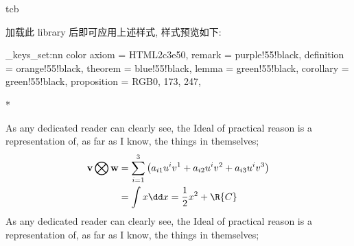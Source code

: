 \begin{function}[added=2025-06-29]{tcb}
  \begin{syntax}
  \end{syntax}
  加载此 library 后即可应用上述样式, 样式预览如下: 
\end{function}
\begingroup
\ExplSyntaxOn\makeatletter
\ztex_keys_set:nn {color}
  {
    axiom       = {HTML}{2c3e50},
    remark      = purple!55!black,
    definition  = orange!55!black,
    theorem     = blue!55!black,
    lemma       = green!55!black,
    corollary   = green!55!black,
    proposition = {RGB}{0, 173, 247},
  }
\makeatother\ExplSyntaxOff
{}
\begin{DocExample}*
\begin{theorem}
As any dedicated reader can clearly see, the Ideal of practical
reason is a representation of, as far as I know, the things in themselves; 
\begin{align}
\underset{}{\mathbf{v} \bigotimes \mathbf{w}} 
    & = \sum_{i=1}^3\left(a_{i1}u^iv^1+a_{i2}u^iv^2+a_{i3}u^iv^3\right) \\
    & = \int x \dd x = \frac12 x^2 + \R{C} 
  \end{align}  
As any dedicated reader can clearly see, the Ideal of practical
reason is a representation of, as far as I know, the things in themselves;%
\end{theorem}
\end{DocExample}
\endgroup



